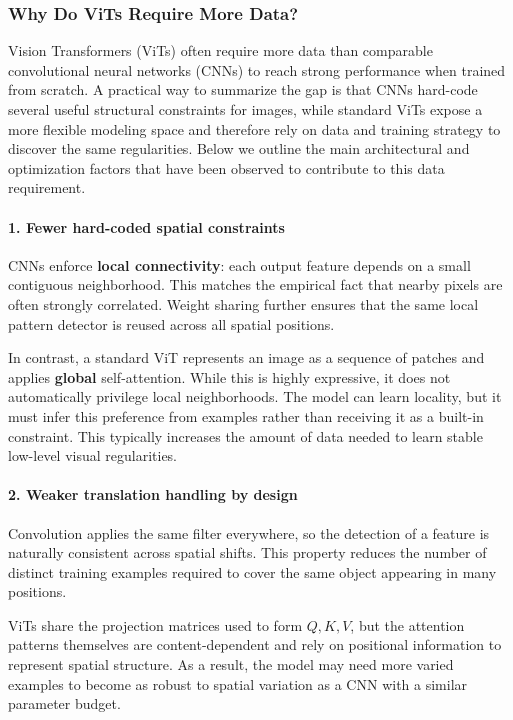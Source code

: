 \newpage

\subsubsection{Why Do ViTs Require More Data?}
\label{subsubsec:chapter18_vit_data_hungry}

\noindent
Vision Transformers (ViTs) often require more data than comparable convolutional neural networks (CNNs) to reach strong performance when trained from scratch. A practical way to summarize the gap is that CNNs hard-code several useful structural constraints for images, while standard ViTs expose a more flexible modeling space and therefore rely on data and training strategy to discover the same regularities. Below we outline the main architectural and optimization factors that have been observed to contribute to this data requirement.

\paragraph{1. Fewer hard-coded spatial constraints}
CNNs enforce \textbf{local connectivity}: each output feature depends on a small contiguous neighborhood. This matches the empirical fact that nearby pixels are often strongly correlated. Weight sharing further ensures that the same local pattern detector is reused across all spatial positions.

\noindent
In contrast, a standard ViT represents an image as a sequence of patches and applies \textbf{global} self-attention. While this is highly expressive, it does not automatically privilege local neighborhoods. The model can learn locality, but it must infer this preference from examples rather than receiving it as a built-in constraint. This typically increases the amount of data needed to learn stable low-level visual regularities.

\paragraph{2. Weaker translation handling by design}
Convolution applies the same filter everywhere, so the detection of a feature is naturally consistent across spatial shifts. This property reduces the number of distinct training examples required to cover the same object appearing in many positions.

\noindent
ViTs share the projection matrices used to form \(Q, K, V\), but the attention patterns themselves are content-dependent and rely on positional information to represent spatial structure. As a result, the model may need more varied examples to become as robust to spatial variation as a CNN with a similar parameter budget.


